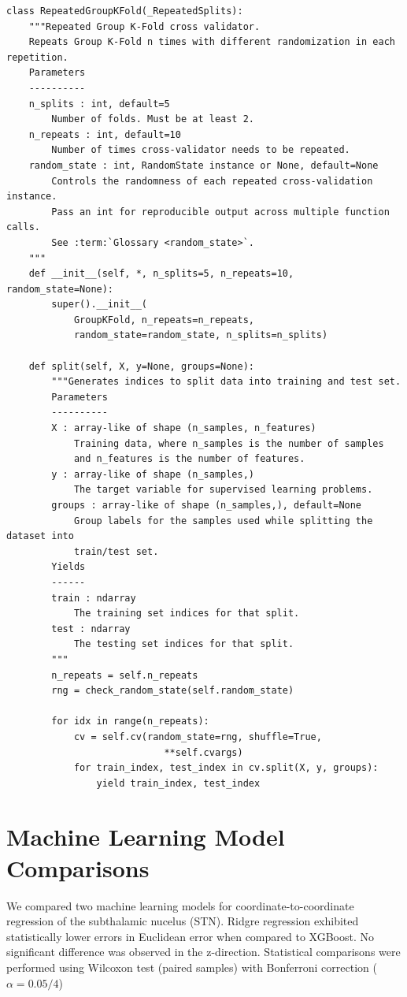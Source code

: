 \begin{verbatim}
class RepeatedGroupKFold(_RepeatedSplits):
    """Repeated Group K-Fold cross validator.
    Repeats Group K-Fold n times with different randomization in each repetition.
    Parameters
    ----------
    n_splits : int, default=5
        Number of folds. Must be at least 2.
    n_repeats : int, default=10
        Number of times cross-validator needs to be repeated.
    random_state : int, RandomState instance or None, default=None
        Controls the randomness of each repeated cross-validation instance.
        Pass an int for reproducible output across multiple function calls.
        See :term:`Glossary <random_state>`.
    """
    def __init__(self, *, n_splits=5, n_repeats=10, random_state=None):
        super().__init__(
            GroupKFold, n_repeats=n_repeats,
            random_state=random_state, n_splits=n_splits)
        
    def split(self, X, y=None, groups=None):
        """Generates indices to split data into training and test set.
        Parameters
        ----------
        X : array-like of shape (n_samples, n_features)
            Training data, where n_samples is the number of samples
            and n_features is the number of features.
        y : array-like of shape (n_samples,)
            The target variable for supervised learning problems.
        groups : array-like of shape (n_samples,), default=None
            Group labels for the samples used while splitting the dataset into
            train/test set.
        Yields
        ------
        train : ndarray
            The training set indices for that split.
        test : ndarray
            The testing set indices for that split.
        """
        n_repeats = self.n_repeats
        rng = check_random_state(self.random_state)

        for idx in range(n_repeats):
            cv = self.cv(random_state=rng, shuffle=True,
                            **self.cvargs)
            for train_index, test_index in cv.split(X, y, groups):
                yield train_index, test_index
\end{verbatim}

\newpage
\section{Machine Learning Model Comparisons}\label{app:qualitycontrol}
We compared two machine learning models for coordinate-to-coordinate regression of the subthalamic nucelus (STN). Ridgre regression exhibited statistically lower errors in Euclidean error when compared to XGBoost. No significant difference was observed in the z-direction. Statistical comparisons were performed using Wilcoxon test (paired samples) with Bonferroni correction (\(\alpha = 0.05/4\))



